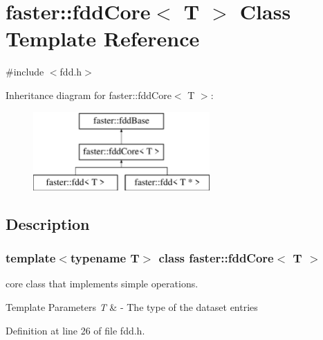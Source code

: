 \hypertarget{classfaster_1_1fddCore}{}\section{faster\+:\+:fdd\+Core$<$ T $>$ Class Template Reference}
\label{classfaster_1_1fddCore}


{\ttfamily \#include $<$fdd.\+h$>$}

Inheritance diagram for faster\+:\+:fdd\+Core$<$ T $>$\+:\begin{figure}[H]
\begin{center}
\leavevmode
\includegraphics[height=3.000000cm]{classfaster_1_1fddCore}
\end{center}
\end{figure}


\subsection{Description}
\subsubsection*{template$<$typename T$>$\newline
class faster\+::fdd\+Core$<$ T $>$}

core class that implements simple operations. 


\begin{DoxyTemplParams}{Template Parameters}
{\em T} & -\/ The type of the dataset entries \\
\hline
\end{DoxyTemplParams}


Definition at line 26 of file fdd.\+h.


